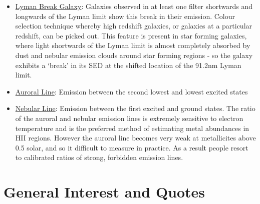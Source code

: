 \documentclass{literature}
\begin{document}
\begin{itemize}
\item \underline{Lyman Break Galaxy}: Galaxies observed in at least one filter shortwards and longwards of the Lyman limit show this break in their emission. Colour selection technique whereby high redshift galaxies, or galaxies at a particular redshift, can be picked out. This feature is present in star forming galaxies, where light shortwards of the Lyman limit is almost completely absorbed by dust and nebular emission clouds around star forming regions - so the galaxy exhibits a `break' in its SED at the shifted location of the 91.2nm Lyman limit.
\item \underline{Auroral Line}: Emission between the second lowest and lowest excited states 
\item \underline{Nebular Line}: Emission between the first excited and ground states. The ratio of the auroral and nebular emission lines is extremely sensitive to electron temperature and is the preferred method of estimating metal abundances in HII regions. However the auroral line becomes very weak at metallicites above 0.5 solar, and so it difficult to measure in practice. As a result people resort to calibrated ratios of strong, forbidden emission lines.  
\end{itemize}





\section{General Interest and Quotes}
\end{document}
